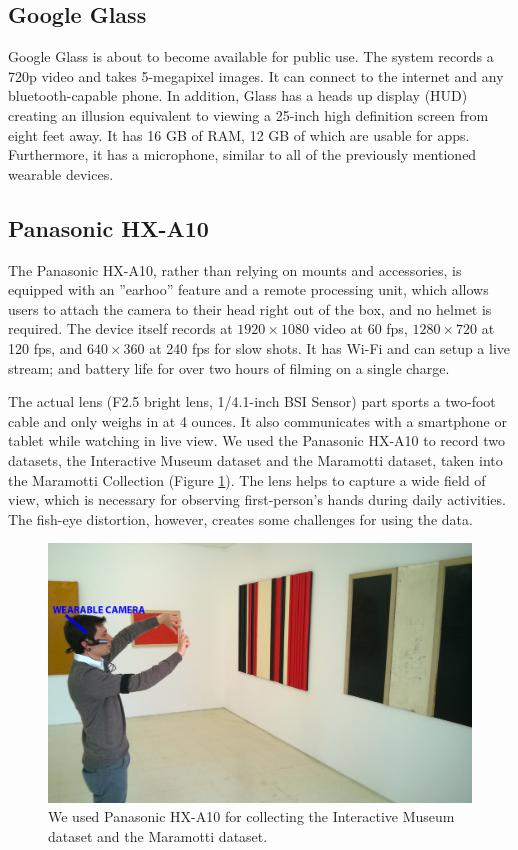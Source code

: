 \subsection{Google Glass}
Google Glass is about to become available for public use. The system records a 720p video and
takes 5-megapixel images. It can connect to the internet and any bluetooth-capable phone. In
addition, Glass has a heads up display (HUD) creating an illusion equivalent to viewing a 25-inch
high definition screen from eight feet away. It has 16 GB of RAM, 12 GB of which are usable for
apps. Furthermore, it has a microphone, similar to all of the previously mentioned wearable devices.

\subsection{Panasonic HX-A10}
\label{panasonic}
The Panasonic HX-A10, rather than relying on mounts and accessories, is equipped with an ''earhoo'' feature and a remote processing unit, which allows users to attach the camera to their head right out of the box, and no helmet is required. The device itself records at $1920\times1080$ video at 60 fps, $1280\times 720$ at 120 fps, and $640\times360$ at 240 fps for slow shots. It has Wi-Fi and can setup a live stream; and battery life for over two hours of filming on a single charge.

The actual lens (F2.5 bright lens, 1/4.1-inch BSI Sensor) part sports a two-foot cable and only weighs in at 4 ounces. It also communicates with a smartphone or tablet while watching in live view. We used the Panasonic HX-A10 to record two datasets, the Interactive Museum dataset and the Maramotti dataset, taken into the Maramotti Collection (Figure \ref{fig:Panasonic}). The lens helps to capture a wide field of view, which is necessary for observing first-person’s hands during daily activities. The fish-eye distortion, however, creates some challenges for using the data.


\begin{figure}[htbp]
	\centering
		\includegraphics[width=0.4\linewidth]{Figures/lore_maramotti.jpg}
	\caption{We used Panasonic HX-A10 for collecting the Interactive Museum dataset and the Maramotti dataset.}
	\label{fig:Panasonic}
\end{figure}

